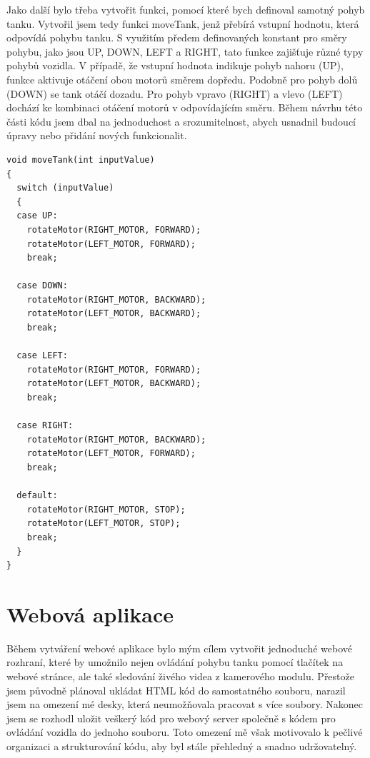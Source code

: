 \documentclass[12pt, a4paper,
oneside
openany
]{report}
\begin{document}
\noindent Jako další bylo třeba vytvořit funkci, pomocí které bych definoval samotný pohyb tanku. Vytvořil jsem tedy funkci moveTank, jenž přebírá vstupní hodnotu, která odpovídá pohybu tanku. S využitím předem definovaných konstant pro směry pohybu, jako jsou UP, DOWN, LEFT a RIGHT, tato funkce zajišťuje různé typy pohybů vozidla. V případě, že vstupní hodnota indikuje pohyb nahoru (UP), funkce aktivuje otáčení obou motorů směrem dopředu. Podobně pro pohyb dolů (DOWN) se tank otáčí dozadu. Pro pohyb vpravo (RIGHT) a vlevo (LEFT) dochází ke kombinaci otáčení motorů v odpovídajícím směru. Během návrhu této části kódu jsem dbal na jednoduchost a srozumitelnost, abych usnadnil budoucí úpravy nebo přidání nových funkcionalit.

\vspace*{0.05\textheight}

\begin{lstlisting}[style=arduinoStyle]
void moveTank(int inputValue)
{
  switch (inputValue)
  {
  case UP:
    rotateMotor(RIGHT_MOTOR, FORWARD);
    rotateMotor(LEFT_MOTOR, FORWARD);
    break;
    
  case DOWN:
    rotateMotor(RIGHT_MOTOR, BACKWARD);
    rotateMotor(LEFT_MOTOR, BACKWARD);
    break;
    
  case LEFT:
    rotateMotor(RIGHT_MOTOR, FORWARD);
    rotateMotor(LEFT_MOTOR, BACKWARD);
    break;
    
  case RIGHT:
    rotateMotor(RIGHT_MOTOR, BACKWARD);
    rotateMotor(LEFT_MOTOR, FORWARD);
    break;
    
  default:
    rotateMotor(RIGHT_MOTOR, STOP);
    rotateMotor(LEFT_MOTOR, STOP);
    break;
  }
}
\end{lstlisting}

 
 
 \section{Webová aplikace}
\noindent Během vytváření webové aplikace bylo mým cílem vytvořit jednoduché webové rozhraní, které by umožnilo nejen ovládání pohybu tanku pomocí tlačítek na webové stránce, ale také sledování živého videa z kamerového modulu. Přestože jsem původně plánoval ukládat HTML kód do samostatného souboru, narazil jsem na omezení mé desky, která neumožňovala pracovat s více soubory. Nakonec jsem se rozhodl uložit veškerý kód pro webový server společně s kódem pro ovládání vozidla do jednoho souboru. Toto omezení mě však motivovalo k pečlivé organizaci a strukturování kódu, aby byl stále přehledný a snadno udržovatelný. 
\end{document}
